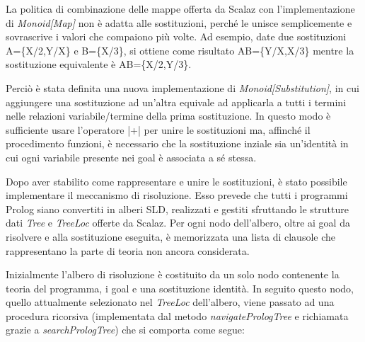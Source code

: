 La politica di combinazione delle mappe offerta da Scalaz con l'implementazione di \textit{Monoid[Map]} non è adatta alle sostituzioni, perché le unisce semplicemente e sovrascrive i valori che compaiono più volte. Ad esempio, date due sostituzioni A=\{X/2,Y/X\} e B=\{X/3\}, si ottiene come risultato AB=\{Y/X,X/3\} mentre la sostituzione equivalente è AB=\{X/2,Y/3\}.

Perciò è stata definita una nuova implementazione di \textit{Monoid[Substitution]}, in cui aggiungere una sostituzione ad un'altra equivale ad applicarla a tutti i termini nelle relazioni variabile/termine della prima sostituzione. In questo modo è sufficiente usare l'operatore |+| per unire le sostituzioni ma, affinché il procedimento funzioni, è necessario che la sostituzione inziale sia un'identità in cui ogni variabile presente nei goal è associata a sé stessa.

\newpage



Dopo aver stabilito come rappresentare e unire le sostituzioni, è stato possibile implementare il meccanismo di risoluzione. Esso prevede che tutti i programmi Prolog siano convertiti in alberi SLD, realizzati e gestiti sfruttando le strutture dati \textit{Tree} e \textit{TreeLoc} offerte da Scalaz. Per ogni nodo dell'albero, oltre ai goal da risolvere e alla sostituzione eseguita, è memorizzata una lista di clausole che rappresentano la parte di teoria non ancora considerata.

Inizialmente l'albero di risoluzione è costituito da un solo nodo contenente la teoria del programma, i goal e una sostituzione identità. In seguito questo nodo, quello attualmente selezionato nel \textit{TreeLoc} dell'albero, viene passato ad una procedura ricorsiva (implementata dal metodo \textit{navigatePrologTree} e richiamata grazie a \textit{searchPrologTree}) che si comporta come segue:

